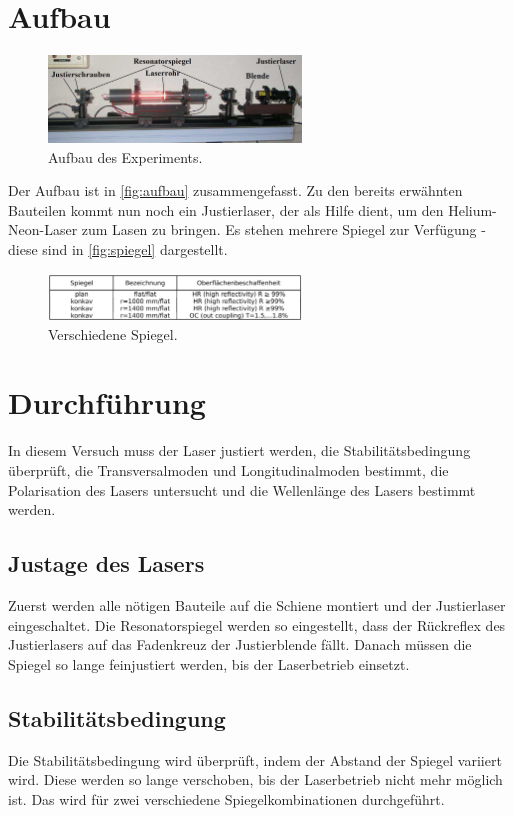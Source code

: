 \section{Aufbau}\label{sec:aufbau}
\begin{figure}[H]
    \centering
    \includegraphics[width=0.6\textwidth]{grafiken/aufbau.jpg}
    \caption{Aufbau des Experiments.\cite{V61}}
    \label{fig:aufbau}
\end{figure}
Der Aufbau ist in \autoref{fig:aufbau} zusammengefasst. Zu den bereits erwähnten Bauteilen kommt nun noch ein Justierlaser, der als Hilfe dient, um den Helium-Neon-Laser zum Lasen zu bringen.
Es stehen mehrere Spiegel zur Verfügung - diese sind in \autoref{fig:spiegel} dargestellt.
\begin{figure}[H]
    \centering
    \includegraphics[width=0.6\textwidth]{grafiken/spiegel.jpg}
    \caption{Verschiedene Spiegel.\cite{V61}}
    \label{fig:spiegel}
\end{figure}

\section{Durchführung}
\label{sec:Durchführung}
In diesem Versuch muss der Laser justiert werden, die Stabilitätsbedingung überprüft, die Transversalmoden und Longitudinalmoden bestimmt, die Polarisation des Lasers untersucht und die Wellenlänge des Lasers bestimmt werden.
\subsection{Justage des Lasers}
Zuerst werden alle nötigen Bauteile auf die Schiene montiert und der Justierlaser eingeschaltet. Die Resonatorspiegel werden so eingestellt, dass der Rückreflex des Justierlasers
auf das Fadenkreuz der Justierblende fällt. Danach müssen die Spiegel so lange feinjustiert werden, bis der Laserbetrieb einsetzt.
\subsection{Stabilitätsbedingung}
Die Stabilitätsbedingung wird überprüft, indem der Abstand der Spiegel variiert wird. Diese werden so lange verschoben, bis der Laserbetrieb nicht mehr möglich ist. Das wird für 
zwei verschiedene Spiegelkombinationen durchgeführt.
